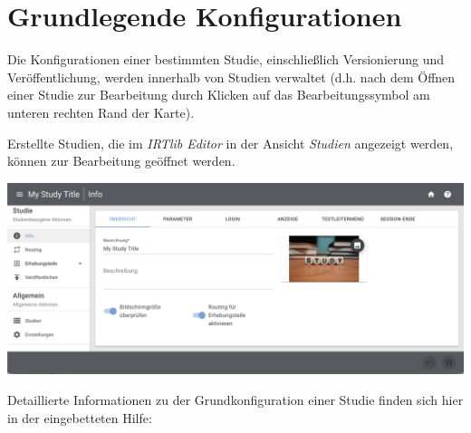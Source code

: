 \documentclass[
  letterpaper,
  DIV=11]{scrreprt}
\begin{document}
\hypertarget{grundlegende-konfigurationen-1}{%
\section{Grundlegende
Konfigurationen}\label{grundlegende-konfigurationen-1}}

Die Konfigurationen einer bestimmten Studie, einschließlich
Versionierung und Veröffentlichung, werden innerhalb von Studien
verwaltet (d.h. nach dem Öffnen einer Studie zur Bearbeitung durch
Klicken auf das Bearbeitungssymbol am unteren rechten Rand der Karte).

Erstellte Studien, die im \emph{IRTlib Editor} in der Ansicht
\emph{Studien} angezeigt werden, können zur Bearbeitung geöffnet werden.

\includegraphics[width=1\textwidth,height=\textheight]{img/screenshot-studies-info.de-DEU.png}

Detaillierte Informationen zu der Grundkonfiguration einer Studie finden
sich hier in der eingebetteten Hilfe:
\end{document}
